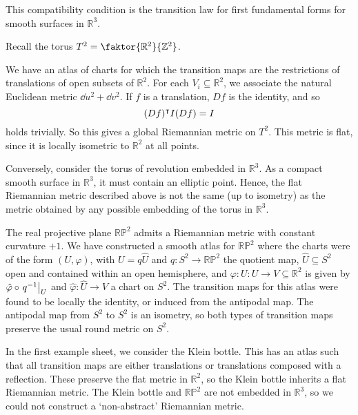 This compatibility condition is the transition law for first fundamental forms for smooth surfaces in \( \mathbb R^3 \).
\begin{example}
	Recall the torus \( T^2 = \faktor{\mathbb R^2}{\mathbb Z^2} \).
	\begin{center}
	\end{center}
	We have an atlas of charts for which the transition maps are the restrictions of translations of open subsets of \( \mathbb R^2 \).
	For each \( V_i \subseteq \mathbb R^2 \), we associate the natural Euclidean metric \( \dd{u}^2 + \dd{v}^2 \).
	If \( f \) is a translation, \( Df \) is the identity, and so
	\[
		(Df)^\intercal I (Df) = I
	\]
	holds trivially.
	So this gives a global Riemannian metric on \( T^2 \).
	This metric is flat, since it is locally isometric to \( \mathbb R^2 \) at all points.

	Conversely, consider the torus of revolution embedded in \( \mathbb R^3 \).
	As a compact smooth surface in \( \mathbb R^3 \), it must contain an elliptic point.
	Hence, the flat Riemannian metric described above is not the same (up to isometry) as the metric obtained by any possible embedding of the torus in \( \mathbb R^3 \).

	The real projective plane \( \mathbb R \mathbb P^2 \) admits a Riemannian metric with constant curvature \( +1 \).
	We have constructed a smooth atlas for \( \mathbb R \mathbb P^2 \) where the charts were of the form \( (U, \varphi) \), with \( U = q \hat U \) and \( q \colon S^2 \to \mathbb R \mathbb P^2 \) the quotient map, \( \hat U \subseteq S^2 \) open and contained within an open hemisphere, and \( \varphi \colon U \colon U \to V \subseteq \mathbb R^2 \) is given by \( \hat \varphi \circ \eval{q^{-1}}_U \) and \( \hat \varphi \colon \hat U \to V \) a chart on \( S^2 \).
	The transition maps for this atlas were found to be locally the identity, or induced from the antipodal map.
	The antipodal map from \( S^2 \) to \( S^2 \) is an isometry, so both types of transition maps preserve the usual round metric on \( S^2 \).

	In the first example sheet, we consider the Klein bottle.
	This has an atlas such that all transition maps are either translations or translations composed with a reflection.
	These preserve the flat metric in \( \mathbb R^2 \), so the Klein bottle inherits a flat Riemannian metric.
	The Klein bottle and \( \mathbb R \mathbb P^2 \) are not embedded in \( \mathbb R^3 \), so we could not construct a `non-abstract' Riemannian metric.
\end{example}
